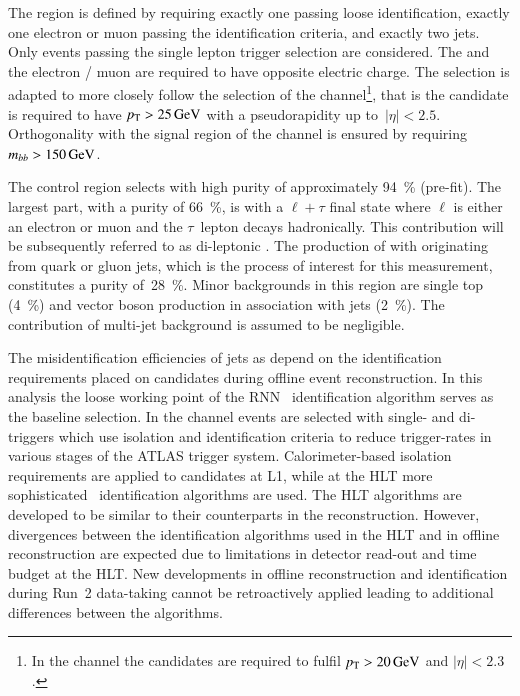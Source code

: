The region is defined by requiring exactly one \tauhadvis passing
loose identification, exactly one electron or muon passing the
identification criteria, and exactly two \btagged
jets. Only events passing the single lepton trigger selection are
considered. The \tauhadvis and the electron / muon are required to
have opposite electric charge. The \tauhadvis selection is adapted to
more closely follow the selection of the \hadhad channel\footnote{In
  the \lephad channel the \tauhadvis candidates are required to fulfil
  $\pT > \SI{20}{\GeV}$ and $|\eta| < 2.3$.}, that is the \tauhadvis
candidate is required to have $p_{\text{T}} > \SI{25}{\ensuremath{\text{GeV}}}$ with a
pseudorapidity up to~$|\eta| < 2.5$. Orthogonality with the signal
region of the \lephad channel is ensured by requiring
$m_{bb} > \SI{150}{\ensuremath{\text{GeV}}}$.


The control region selects \ttbar with high purity of approximately
\SI{94}{\percent} (pre-fit). The largest part, with a purity of
\SI{66}{\percent}, is \ttbar with a $\ell + \tau$ final state where
$\ell$ is either an electron or muon and the $\tau$~lepton decays
hadronically. This contribution will be subsequently referred to as
di-leptonic \ttbar. The production of \ttbar with \tauhadvis
originating from quark or gluon jets, which is the process of interest
for this measurement, constitutes a purity of~\SI{28}{\percent}.
Minor backgrounds in this region are single top (\SI{4}{\percent}) and
vector boson production in association with jets
(\SI{2}{\percent}). The contribution of multi-jet background is
assumed to be negligible.



The misidentification efficiencies of jets as \tauhadvis depend on the
identification requirements placed on \tauhadvis candidates during
offline event reconstruction. In this analysis the loose working point
of the RNN \tauhadvis~identification algorithm serves as the baseline
\tauhadvis selection. In the \hadhad channel events are selected with
single- and di-\tauhadvis triggers which use isolation and
identification criteria to reduce trigger-rates in various stages of
the ATLAS trigger system. Calorimeter-based isolation requirements are
applied to \tauhadvis candidates at L1, while at the HLT more
sophisticated \tauhadvis~identification algorithms are used.  The HLT
algorithms are developed to be similar to their counterparts in the
\tauhadvis reconstruction. However, divergences between the
identification algorithms used in the HLT and in offline \tauhadvis
reconstruction are expected due to limitations in detector read-out
and time budget at the HLT. New developments in offline \tauhadvis
reconstruction and identification during Run~2 data-taking cannot be
retroactively applied leading to additional differences between the
algorithms.

